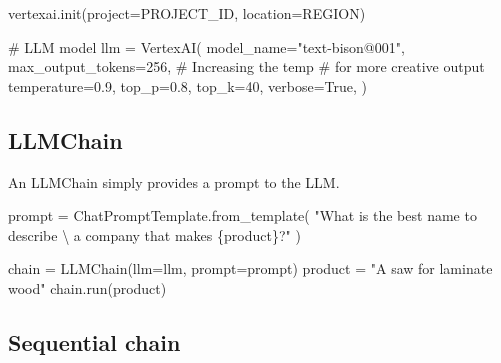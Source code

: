 \documentclass[
  letterpaper,
  DIV=11,
  numbers=noendperiod]{scrreprt}
\newenvironment{Shaded}{\begin{snugshade}}{\end{snugshade}}
\newcommand{\CharTok}[1]{\textcolor[rgb]{0.13,0.47,0.30}{#1}}
\newcommand{\CommentTok}[1]{\textcolor[rgb]{0.37,0.37,0.37}{#1}}
\newcommand{\DecValTok}[1]{\textcolor[rgb]{0.68,0.00,0.00}{#1}}
\newcommand{\FloatTok}[1]{\textcolor[rgb]{0.68,0.00,0.00}{#1}}
\newcommand{\NormalTok}[1]{\textcolor[rgb]{0.00,0.23,0.31}{#1}}
\newcommand{\OperatorTok}[1]{\textcolor[rgb]{0.37,0.37,0.37}{#1}}
\newcommand{\SpecialCharTok}[1]{\textcolor[rgb]{0.37,0.37,0.37}{#1}}
\newcommand{\StringTok}[1]{\textcolor[rgb]{0.13,0.47,0.30}{#1}}
\newcommand{\VariableTok}[1]{\textcolor[rgb]{0.07,0.07,0.07}{#1}}
\begin{document}
\begin{Shaded}
\begin{Highlighting}[]
\NormalTok{vertexai.init(project}\OperatorTok{=}\NormalTok{PROJECT\_ID, location}\OperatorTok{=}\NormalTok{REGION)}

\CommentTok{\# LLM model}
\NormalTok{llm }\OperatorTok{=}\NormalTok{ VertexAI(}
\NormalTok{    model\_name}\OperatorTok{=}\StringTok{"text{-}bison@001"}\NormalTok{,}
\NormalTok{    max\_output\_tokens}\OperatorTok{=}\DecValTok{256}\NormalTok{,}
    \CommentTok{\# Increasing the temp}
    \CommentTok{\# for more creative output}
\NormalTok{    temperature}\OperatorTok{=}\FloatTok{0.9}\NormalTok{,}
\NormalTok{    top\_p}\OperatorTok{=}\FloatTok{0.8}\NormalTok{,}
\NormalTok{    top\_k}\OperatorTok{=}\DecValTok{40}\NormalTok{,}
\NormalTok{    verbose}\OperatorTok{=}\VariableTok{True}\NormalTok{,}
\NormalTok{)}
\end{Highlighting}
\end{Shaded}

\hypertarget{llmchain}{%
\subsection{LLMChain}\label{llmchain}}

An LLMChain simply provides a prompt to the LLM.

\begin{Shaded}
\begin{Highlighting}[]
\NormalTok{prompt }\OperatorTok{=}\NormalTok{ ChatPromptTemplate.from\_template(}
    \StringTok{"What is the best name to describe }\CharTok{\textbackslash{}}
\StringTok{    a company that makes }\SpecialCharTok{\{product\}}\StringTok{?"}
\NormalTok{)}
\end{Highlighting}
\end{Shaded}

\begin{Shaded}
\begin{Highlighting}[]
\NormalTok{chain }\OperatorTok{=}\NormalTok{ LLMChain(llm}\OperatorTok{=}\NormalTok{llm, prompt}\OperatorTok{=}\NormalTok{prompt)}
\NormalTok{product }\OperatorTok{=} \StringTok{"A saw for laminate wood"}
\NormalTok{chain.run(product)}
\end{Highlighting}
\end{Shaded}

\hypertarget{sequential-chain}{%
\subsection{Sequential chain}\label{sequential-chain}}
\end{document}

